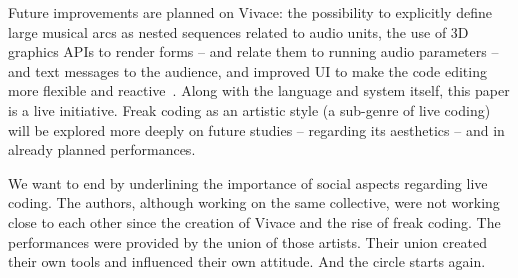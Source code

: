 \documentclass[12pt,times,twocolumn]{article}
\begin{document}
Future improvements are planned on Vivace: the possibility to
explicitly define large musical arcs as nested sequences related to
audio units, the use of 3D graphics APIs to render forms -- and relate them to running audio parameters -- 
and text messages to the audience, and improved UI to make the code editing more
flexible and reactive~\cite{brett}. Along with the language and
system itself, this paper is a live initiative. Freak coding as an
artistic style (a sub-genre of live coding) will be explored more deeply on future studies --
regarding its aesthetics -- and in already planned performances.

We want to end by underlining the importance of social aspects
regarding live coding. The authors, although working on the same
collective, were not working close to each other since the creation of
Vivace and the rise of freak coding. The performances were provided by
the union of those artists. Their union created their own tools and
influenced their own attitude. And the circle starts again.


% 

\end{document}
